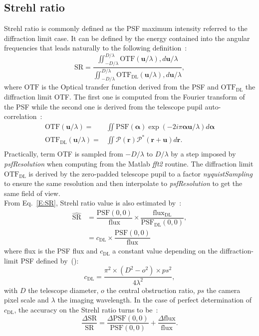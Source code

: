 \documentclass[12pt]{article}
\newcommand{\otfdl}{\text{OTF}_\text{DL}}
\newcommand{\rbb}{\boldsymbol{r}}
\begin{document}
\subsection{Strehl ratio}
Strehl ratio is commonly defined as the PSF maximum intensity referred to the diffraction limit case. It can be defined by the energy contained into the angular frequencies that leads naturally to the following definition~:
\begin{equation}\label{E:SR}
	\widehat{\text{SR}} = \dfrac{\iint_{-D/\lambda}^{D/\lambda} \text{OTF}(\boldsymbol{u}/\lambda),d\boldsymbol{u}/\lambda}{\iint_{-D/\lambda}^{D/\lambda} \otfdl(\boldsymbol{u}/\lambda),d\boldsymbol{u}/\lambda},
\end{equation}
where $\text{OTF}$ is the Optical transfer function derived from the PSF and $\otfdl$ the diffraction limit OTF. The first one is computed from the Fourier transform of the PSF while the second one is derived from the telescope pupil auto-correlation~:
\begin{equation}
	\begin{aligned}
	\text{OTF}(\boldsymbol{u}/\lambda)=&  \iint\text{PSF}(\boldsymbol{\alpha})\exp(-2i\pi\boldsymbol{\alpha}\boldsymbol{u}/\lambda)d\boldsymbol{\alpha} \\ 
	 \otfdl(\boldsymbol{u}/\lambda) =& \iint \mathcal{P}(\rbb)\mathcal{P}^*(\rbb + \boldsymbol{u})d\rbb.\\
	\end{aligned}
\end{equation}
Practically, term OTF is sampled from $-D/\lambda$ to $D/\lambda$ by a step imposed by \emph{psfResolution} when computing from the Matlab \emph{fft2} routine. The diffraction limit $\otfdl$ is derived by the zero-padded telescope pupil to a factor \emph{nyquistSampling} to ensure the same resolution and then interpolate to \emph{psfResolution} to get the same field of view.\\

From Eq.~\ref{E:SR}, Strehl ratio value is also estimated by~:
\begin{equation}
	\begin{aligned}
		\widehat{\text{SR}} &= \dfrac{\text{PSF}(0,0)}{\text{flux}} \times  \dfrac{\text{flux}_\text{DL}}{\text{PSF}_\text{DL}(0,0)},\\
		& = c_\text{DL}\times\dfrac{\text{PSF}(0,0)}{\text{flux}}
	\end{aligned}
\end{equation}
where flux is the PSF flux and $c_\text{DL}$ a constant value depending on the diffraction-limit PSF defined by~(\cite{Gendron1995}):
\begin{equation}
	c_\text{DL} = \dfrac{\pi^2\times(D^2 - o^2)\times ps^2}{4\lambda^2},
\end{equation}
with $D$ the telescope diameter, $o$ the central obstruction ratio, $ps$ the camera pixel scale and $\lambda$ the imaging wavelength. In the case of perfect determination of $c_\text{DL}$, the accuracy on the Strehl ratio turns to be~:
\begin{equation}
		\dfrac{\Delta  \text{SR}}{\text{SR}}  = \dfrac{\Delta \text{PSF}(0,0)}{\text{PSF}(0,0)}  + \dfrac{\Delta \text{flux}}{\text{flux}}.		
\end{equation}
\end{document}

